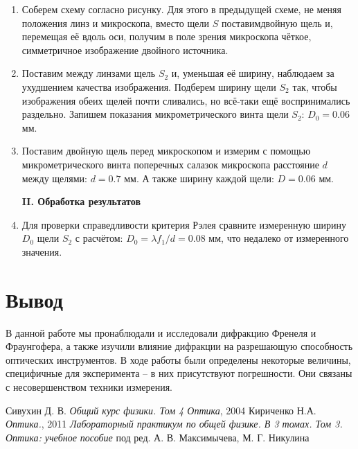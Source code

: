 \documentclass[12pt,a4paper]{article}
\begin{document}
	\begin{enumerate}
		\item Соберем схему согласно рисунку. Для этого в предыдущей схеме, не меняя положения линз и микроскопа, вместо щели $S$ поставимдвойную щель и, перемещая её вдоль оси, получим в поле зрения микроскопа чёткое, симметричное изображение двойного источника.
		
		\item Поставим между линзами щель $S_2$ и, уменьшая её ширину, наблюдаем за ухудшением качества изображения. Подберем ширину щели $S_2$ так, чтобы изображения обеих щелей почти сливались, но всё-таки ещё воспринимались раздельно. Запишем показания микрометрического винта щели $S_2$: $D_0 = 0.06$ мм.
		
		\item Поставим двойную щель перед микроскопом и измерим с помощью микрометрического винта поперечных салазок микроскопа расстояние $d$ между щелями: $d = 0.7$ мм. А также ширину каждой щели: $D = 0.06$ мм.
		
		
		\begin{center}
			\textbf{II. Обработка результатов}
		\end{center}
	
		\item Для проверки справедливости критерия Рэлея сравните измеренную ширину $D_0$ щели $S_2$ с расчётом: $D_0 = \lambda f_1 / d = 0.08$ мм, что недалеко от измеренного значения.
	\end{enumerate}
	
	
	\vspace{15mm}
	\section*{Вывод}
	В данной работе мы пронаблюдали и исследовали дифракцию Френеля и Фраунгофера, а также изучили влияние дифракции на разрешающую способность оптических инструментов. В ходе работы были определены некоторые величины, специфичные для эксперимента -- в них присутствуют погрешности. Они связаны с несовершенством техники измерения.

\newpage
\begin{thebibliography}{9}
	 Сивухин Д. В. \emph{Общий курс физики. Том 4 Оптика}, 2004
	 Кириченко Н.А. \emph{Оптика.}, 2011
	 \emph{Лабораторный практикум по общей физике. В 3 томах. Том 3. Оптика: учебное пособие} под ред. А. В. Максимычева, М. Г. Никулина
\end{thebibliography}
\end{document}
